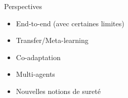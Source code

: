 \documentclass[french,handout]{beamer}
\begin{document}
    \begin{frame}{Perspectives}
        \begin{itemize}
            \item End-to-end (avec certaines limites)
            \item Transfer/Meta-learning
            \item Co-adaptation
            \item Multi-agents
            \item Nouvelles notions de sureté
        \end{itemize}

    \end{frame}

\end{document}
